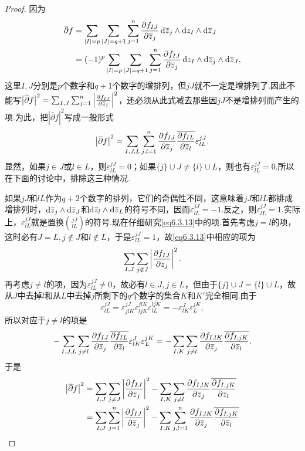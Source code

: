 \begin{proof}
	因为
	\begin{align*}
		\bar{\partial}f
		&=\sum_{|I|=p}\sum_{|J|=q+1}\sum_{j=1
		}^{n}\pp{f_{IJ}}{\bar{z}_j}\dzz_j\wedge\dz_I\wedge\dzz_J\\
		&=(-1)^p\sum_{|I|=p}\sum_{|J|=q+1}\sum_{j=1
		}^{n}\pp{f_{IJ}}{\bar{z}_j}\dz_I\wedge\dzz_j\wedge\dzz_J,
	\end{align*}
	这里$I,J$分别是$p$个数字和$q+1$个数字的增排列，但$jJ$就不一定是增排列了.因此不能写$\left|{}\mkern1mu\overline{\mkern-1mu\partial}f\right|^2=\sum_{I,J}\sum_{j=1}^{n}\left|\frac{\partial f_{IJ}}{\partial {}\mkern1mu\overline{\mkern-1muz}_j}\right|^2$，还必须从此式减去那些因$jJ$不是增排列而产生的项.为此，把$\left|\bar{\partial}f\right|^2$写成一般形式
	\begin{equation}\label{eq6.3.13}
		\left|{}\mkern1mu\overline{\mkern-1mu\partial}f\right|^2=\sum_{I,J,L}\sum_{j,l=1}^{n}\frac{\partial f_{IJ}}{\partial {}\mkern1mu\overline{\mkern-1muz}_j}{}\mkern1mu\overline{\mkern-1mu\frac{\partial f_{IL}}{\partial {}\mkern1mu\overline{\mkern-1muz}_l}}\varepsilon_{lL}^{jJ}.
	\end{equation}
	显然，如果$j\in J$或$l\in L$，则$\varepsilon_{lL}^{jJ}=0$；如果$\{j\}\cup J\neq \{l\}\cup L$，则也有$\varepsilon_{lL}^{jJ}=0$.所以在下面的讨论中，排除这三种情况.
	
	如果$jJ$和$lL$作为$q+2$个数字的排列，它们的奇偶性不同，这意味着$jJ$和$lL$都排成增排列时，$\mathop{}\!\mathrm d{}\mkern1mu\overline{\mkern-1muz}_j\wedge\mathop{}\!\mathrm d{}\mkern1mu\overline{\mkern-1muz}_J$和$\mathop{}\!\mathrm d{}\mkern1mu\overline{\mkern-1muz}_l\wedge\mathop{}\!\mathrm d{}\mkern1mu\overline{\mkern-1muz}_L$的符号不同，因而$\varepsilon_{lL}^{jJ}=-1$.反之，则$\varepsilon_{lL}^{jJ}=1$.实际上，$\varepsilon_{lL}^{jJ}$就是置换$\binom{
	jJ}{lL}$的符号.现在仔细研究\eqref{eq6.3.13}中的项.首先考虑$j=l$的项，这时必有$J=L,j\notin J$和$l\notin L$，于是$\varepsilon_{lL}^{jJ}=1$，故\eqref{eq6.3.13}中相应的项为
	\[\sum_{I,J}\sum_{j\notin J}\left|\frac{\partial f_{IJ}}{\partial z_j}\right|^2.\]
	再考虑$j\neq l$的项，因为$\varepsilon_{lL}^{jJ}\neq0$，故必有$l\in J,j\in L$，但由于$\{j\}\cup J=\{l\}\cup L$，故从$J$中去掉$l$和从$L$中去掉$j$所剩下的$q$个数字的集合$K$和$K'$完全相同.由于
	\[\varepsilon_{lL}^{jJ}=\varepsilon_{jlK}^{jJ}\varepsilon_{ljK}^{jlK}\varepsilon_{lL}^{ljK}=-\varepsilon_{lK}^{J}\varepsilon_{L}^{jK},\]
	所以对应于$j\neq l$的项是
	\[-\sum_{I,J,L}\sum_{j\neq l}\frac{\partial f_{IJ}}{\partial {}\mkern1mu\overline{\mkern-1muz}_j}{}\mkern1mu\overline{\mkern-1mu\frac{\partial f_{IL}}{\partial {}\mkern1mu\overline{\mkern-1muz}_l}}\varepsilon_{lK}^J \varepsilon_{L}^{jK}=-\sum_{I,K}\sum_{j\neq l}\frac{\partial f_{I,lK}}{\partial {}\mkern1mu\overline{\mkern-1muz}_j}{}\mkern1mu\overline{\mkern-1mu\frac{\partial f_{I,jK}}{\partial {}\mkern1mu\overline{\mkern-1muz}_l}}.\]
	于是
	\begin{align*}
		\left|{}\mkern1mu\overline{\mkern-1mu\partial}f\right|^2
		&=\sum_{I,J}\sum_{j\neq J}\left|\frac{\partial f_{IJ}}{\partial {}\mkern1mu\overline{\mkern-1muz}_j}\right|^2-\sum_{I,K}\sum_{j\neq l}\frac{\partial f_{I,lK}}{\partial {}\mkern1mu\overline{\mkern-1muz}_j}{}\mkern1mu\overline{\mkern-1mu\frac{\partial f_{I,jK}}{\partial {}\mkern1mu\overline{\mkern-1muz}_l}}\\
		&=\sum_{I,J}\sum_{j=1}^n\left|\frac{\partial f_{IJ}}{\partial {}\mkern1mu\overline{\mkern-1muz}_j}\right|^2-\sum_{I,K}\sum_{j,l=1}^n\frac{\partial f_{I,lK}}{\partial {}\mkern1mu\overline{\mkern-1muz}_j}{}\mkern1mu\overline{\mkern-1mu\frac{\partial f_{I,jK}}{\partial {}\mkern1mu\overline{\mkern-1muz}_l}}\qedhere
	\end{align*}
\end{proof}
